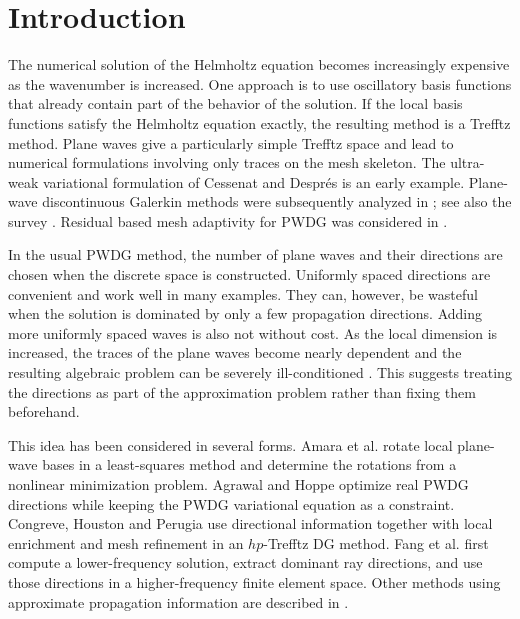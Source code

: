 \documentclass[pdflatex,sn-mathphys-num]{sn-jnl}
\theoremstyle{thmstyleone}
\theoremstyle{thmstyletwo}
\begin{document}
\section{Introduction}\label{sec:intro}
The numerical solution of the Helmholtz equation becomes increasingly expensive as the wavenumber is increased.  One approach is to use oscillatory basis functions that already contain part of the behavior of the solution.  If the local basis functions satisfy the Helmholtz equation exactly, the resulting method is a Trefftz method.  Plane waves give a particularly simple Trefftz space and lead to numerical formulations involving only traces on the mesh skeleton.  The ultra-weak variational formulation of Cessenat and Despr\'es \cite{CessenatDespres1998} is an early example.  Plane-wave discontinuous Galerkin methods were subsequently analyzed in \cite{GittelsonHiptmairPerugia2009,HiptmairMoiolaPerugia2011,HiptmairMoiolaPerugia2016}; see also the survey \cite{HiptmairMoiolaPerugiaSurvey2016}.  Residual based mesh adaptivity for PWDG was considered in \cite{KapitaMonkWarburton2015}.

In the usual PWDG method, the number of plane waves and their directions are chosen when the discrete space is constructed.  Uniformly spaced directions are convenient and work well in many examples.  They can, however, be wasteful when the solution is dominated by only a few propagation directions.  Adding more uniformly spaced waves is also not without cost.  As the local dimension is increased, the traces of the plane waves become nearly dependent and the resulting algebraic problem can be severely ill-conditioned \cite{CongreveGedickePerugia2019}.  This suggests treating the directions as part of the approximation problem rather than fixing them beforehand.

This idea has been considered in several forms.  Amara et al. \cite{AmaraChaudhryDiazDjellouliFiedler2014} rotate local plane-wave bases in a least-squares method and determine the rotations from a nonlinear minimization problem.  Agrawal and Hoppe \cite{AgrawalHoppe2017} optimize real PWDG directions while keeping the PWDG variational equation as a constraint.  Congreve, Houston and Perugia \cite{CongreveHoustonPerugia2019} use directional information together with local enrichment and mesh refinement in an $hp$-Trefftz DG method.  Fang et al. \cite{FangQianZepedaZhao2017} first compute a lower-frequency solution, extract dominant ray directions, and use those directions in a higher-frequency finite element space.  Other methods using approximate propagation information are described in \cite{LamQian2019,HuWang2021}.
\end{document}
